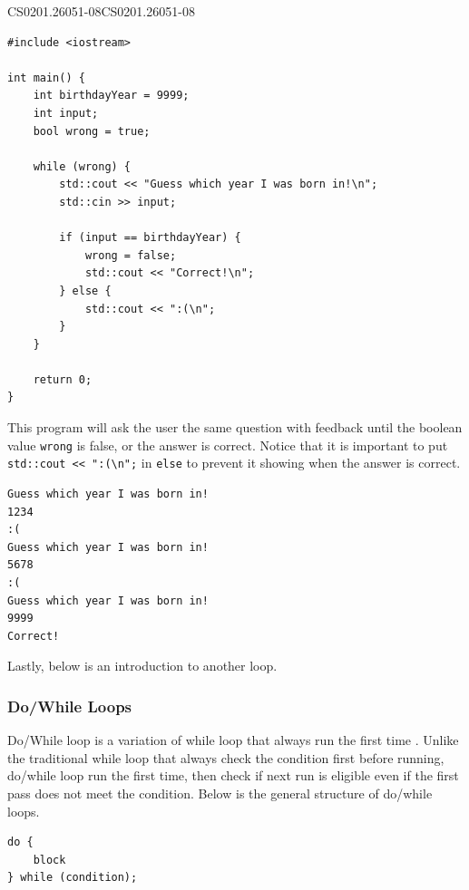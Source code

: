 \documentclass[../../main.tex]{subfiles}
\begin{document}
\begin{cppbox}{CS0201.26051-08}{CS0201.26051-08}
\begin{lstlisting}[style=cppstyle]
#include <iostream>

int main() {
    int birthdayYear = 9999;
    int input;
    bool wrong = true;

    while (wrong) {
        std::cout << "Guess which year I was born in!\n";
        std::cin >> input;

        if (input == birthdayYear) {
            wrong = false;
            std::cout << "Correct!\n";
        } else {
            std::cout << ":(\n";
        }
    }

    return 0;
}
\end{lstlisting}
\end{cppbox}

This program will ask the user the same question with feedback
until the boolean value \verb|wrong| is false, or the answer is
correct. Notice that it is important to put
\verb|std::cout << ":(\n";| in \verb|else| to prevent it showing
when the answer is correct.

\begin{outputbox}
\begin{lstlisting}[style=basic]
Guess which year I was born in!
1234
:(
Guess which year I was born in!
5678
:(
Guess which year I was born in!
9999
Correct!
\end{lstlisting}
\end{outputbox}

Lastly, below is an introduction to another loop.

\subsubsection{Do/While Loops}

Do/While loop is a variation of while loop that always run the first
time \cite{CS02-4}. Unlike the traditional while loop that always
check the condition first before running, do/while loop run the first
time, then check if next run is eligible even if the first pass does
not meet the condition. Below is the general structure of do/while
loops.

\begin{basicbox}
\begin{lstlisting}[style=basic]
do {
    block
} while (condition);
\end{lstlisting}
\end{basicbox}
\end{document}
